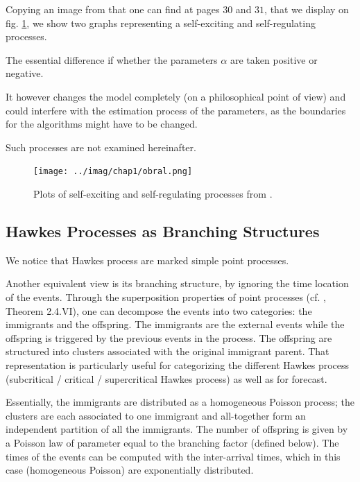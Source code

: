 \documentclass[11pt]{book}
\begin{document}
Copying an image from \cite{obral} that one can find at pages $30$ and $31$, that we display on fig. \ref{fig:obral}, we show two graphs representing a self-exciting and self-regulating processes. 

The essential difference if whether the parameters $\alpha$ are taken positive or negative. 

It however changes the model completely (on a philosophical point of view) and could interfere with the estimation process of the parameters, as the boundaries for the algorithms might have to be changed.

Such processes are not examined hereinafter.

\begin{figure}
\centering
\texttt{[image: ../imag/chap1/obral.png]}
\caption{ Plots of self-exciting and self-regulating processes from \cite{obral}.}
\label{fig:obral}
\end{figure}












\subsection{Hawkes Processes as Branching Structures}
We notice that Hawkes process are marked simple point processes.

Another equivalent view is its branching structure, by ignoring the time location of the events. Through the superposition
properties of point processes (cf. \cite{daley}, Theorem 2.4.VI), one can decompose the events into two categories: the immigrants and the offspring. The immigrants are the external events while the offspring is triggered by the previous events in the process. The offspring are structured into clusters associated with the original immigrant parent. That representation is particularly useful for categorizing the different Hawkes process (subcritical / critical / supercritical Hawkes process) as well as for forecast.

Essentially, the immigrants are distributed as a homogeneous Poisson process; the clusters are each associated to one immigrant and all-together form an independent partition of all the immigrants. The number of offspring is given by a Poisson law of parameter equal to the branching factor (defined below). The times of the events can be computed with the inter-arrival times, which in this case (homogeneous Poisson) are exponentially distributed.
\end{document}
